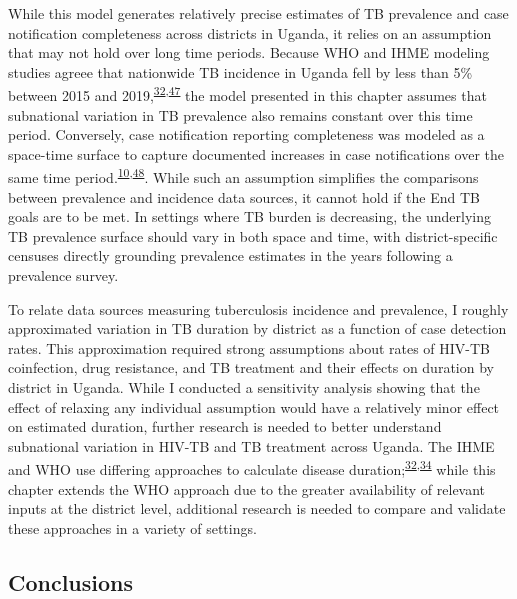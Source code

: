 \documentclass[
]{article}
\begin{document}
While this model generates relatively precise estimates of TB prevalence and case notification completeness across districts in Uganda, it relies on an assumption that may not hold over long time periods. Because WHO and IHME modeling studies agreee that nationwide TB incidence in Uganda fell by less than 5\% between 2015 and 2019,\textsuperscript{\protect\hyperlink{ref-Ledesma2021}{32},\protect\hyperlink{ref-WorldHealthOrganization2019}{47}} the model presented in this chapter assumes that subnational variation in TB prevalence also remains constant over this time period. Conversely, case notification reporting completeness was modeled as a space-time surface to capture documented increases in case notifications over the same time period.\textsuperscript{\protect\hyperlink{ref-UgandaNationalTuberculosisandLeprosyProgramme2020}{10},\protect\hyperlink{ref-UgandaNationalTuberculosisandLeprosyProgramme2017b}{48}}. While such an assumption simplifies the comparisons between prevalence and incidence data sources, it cannot hold if the End TB goals are to be met. In settings where TB burden is decreasing, the underlying TB prevalence surface should vary in both space and time, with district-specific censuses directly grounding prevalence estimates in the years following a prevalence survey.

To relate data sources measuring tuberculosis incidence and prevalence, I roughly approximated variation in TB duration by district as a function of case detection rates. This approximation required strong assumptions about rates of HIV-TB coinfection, drug resistance, and TB treatment and their effects on duration by district in Uganda. While I conducted a sensitivity analysis showing that the effect of relaxing any individual assumption would have a relatively minor effect on estimated duration, further research is needed to better understand subnational variation in HIV-TB and TB treatment across Uganda. The IHME and WHO use differing approaches to calculate disease duration;\textsuperscript{\protect\hyperlink{ref-Ledesma2021}{32},\protect\hyperlink{ref-Glaziou2020}{34}} while this chapter extends the WHO approach due to the greater availability of relevant inputs at the district level, additional research is needed to compare and validate these approaches in a variety of settings.

\hypertarget{conclusions}{%
\subsection{Conclusions}\label{conclusions}}
\end{document}
